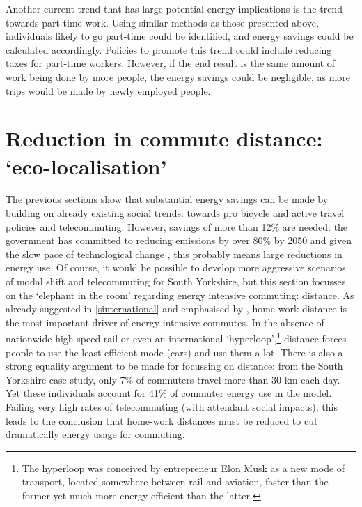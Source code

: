 Another current trend that has large potential energy implications is the
trend towards part-time work. Using similar methods as those presented above,
individuals likely to go part-time could be identified, and energy savings
could be calculated accordingly. Policies to promote this trend could
include reducing taxes for part-time workers. However, if the end result is the
same amount of work being done by more people, the energy savings
could be negligible, as more trips would be made by newly employed people.

\section{Reduction in commute distance: `eco-localisation'} \label{fecoloc}
The previous sections show that substantial energy savings can be made by
building on already existing social trends: towards pro bicycle and active
travel policies and telecommuting. However, savings of more than 12\% are needed:
the government has committed to reducing emissions by over 80\% by 2050
and given the slow pace of technological change \citep{Smil2010}, this
probably means large reductions in energy use. Of course, it would be possible
to develop more aggressive scenarios of modal shift and telecommuting for
South Yorkshire, but this section focusses on the `elephant in the room'
regarding energy intensive commuting: distance. As already suggested in
\cref{sinternational} and
emphasised by \citet{Boussauw2009}, home-work distance is the most important
driver of energy-intensive commutes. In the absence of nationwide high speed rail
or even an international
`hyperloop',\footnote{The
hyperloop was conceived by entrepreneur Elon Musk as a new mode of transport,
located somewhere between rail and aviation, faster than the former yet much
more energy efficient than the latter.
}
distance forces people to use the least efficient mode
(cars) and use them a lot. There is also a strong equality argument to
be made for focussing on distance: from the South Yorkshire case study,
only 7\% of commuters travel more than 30 km each day. Yet these individuals
account for 41\% of commuter energy use in the model. Failing very high
rates of telecommuting (with attendant social impacts),
this leads to the conclusion that home-work distances must be reduced to
cut dramatically energy usage for commuting.

